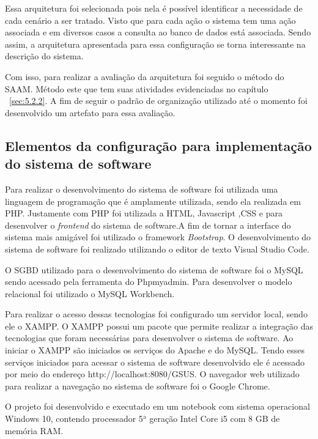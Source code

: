 Essa arquitetura foi selecionada pois nela é possível identificar a necessidade de cada cenário a ser tratado. Visto que para cada ação o sistema tem uma ação associada e em diversos casos a consulta ao banco de dados está associada. Sendo assim, a arquitetura apresentada para essa configuração se torna interessante na descrição do sistema. 

Com isso, para realizar a avaliação da arquitetura foi seguido o método do \acrfull{SAAM}. Método este que tem suas atividades evidenciadas no capítulo ~\ref{sec:5.2.2}. A fim de seguir o padrão de organização utilizado até o momento foi desenvolvido um artefato para essa avaliação.

\subsection{Elementos da configuração para implementação do sistema de software}

Para realizar o desenvolvimento do sistema de software foi utilizada uma linguagem de programação que é amplamente utilizada, sendo ela realizada em PHP. Justamente com PHP foi utilizada a \acrfull{HTML}, Javascript ,\acrfull{CSS} e para desenvolver o \emph{frontend} do sistema de software.A fim de tornar a interface do sistema mais amigável foi utilizado o framework \emph{Bootstrap}. O desenvolvimento do sistema de software foi realizado utilizando o editor de texto Visual Studio Code.

O \acrfull{SGBD} utilizado para o desenvolvimento do sistema de software foi o MySQL sendo acessado pela ferramenta do Phpmyadmin. Para desenvolver o modelo relacional foi utilizado o MySQL Workbench. 

Para realizar o acesso dessas tecnologias foi configurado um servidor local, sendo ele o XAMPP. O XAMPP possui um pacote que permite realizar a integração das tecnologias que foram necessárias para desenvolver o sistema de software.
Ao iniciar o XAMPP são iniciados os serviços do Apache e do MySQL. Tendo esses serviços iniciados para acessar o sistema de software desenvolvido ele é acessado por meio do endereço http://localhost:8080/GSUS. O navegador web utilizado para realizar a navegação no sistema de software foi o Google Chrome.

O projeto foi desenvolvido e executado em um notebook com sistema operacional Windows 10, contendo processador \newcommand{\azinho}{$^{\mathrm a}$} 5$^{\mathrm a}$ geração Intel Core i5 com 8 GB de memória RAM.

